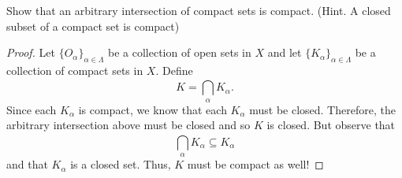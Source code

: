 \documentclass[a4paper]{article}
\begin{document}
   \begin{problem}
       Show that an arbitrary intersection of compact sets is compact. (Hint. A closed subset of a compact set is compact)
   \end{problem}
   \begin{proof}
       Let \( \{ {O}_{\alpha} \}_{\alpha \in \Lambda} \) be a collection of open sets in \( X  \) and let \( \{ {K}_{\alpha} \}_{\alpha \in \Lambda} \) be a collection of compact sets in \( X  \). Define
       \[  K = \bigcap_{  \alpha  }^{  } {K}_{\alpha}. \tag{1} \]
       Since each \( {K}_{\alpha} \) is compact, we know that each \( {K}_{\alpha} \) must be closed. Therefore, the arbitrary intersection above must be closed and so \( K  \) is closed. But observe that 
       \[  \bigcap_{ \alpha }^{  } {K}_{\alpha} \subseteq  {K}_{\alpha} \]
       and that \( K_{\alpha}  \) is a closed set. Thus, \( K  \) must be compact as well! 
   \end{proof}
\end{document}
